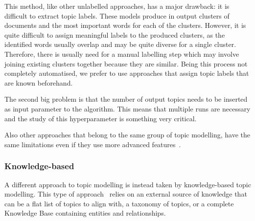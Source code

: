This method, like other unlabelled approaches, has a major drawback: it is difficult to extract topic labels.
These models produce in output clusters of documents and the most important words for each of the clusters.
However, it is quite difficult to assign meaningful labels to the produced clusters, as the identified words usually overlap and may be quite diverse for a single cluster.
Therefore, there is usually need for a manual labelling step which may involve joining existing clusters together because they are similar.
Being this process not completely automatised, we prefer to use approaches that assign topic labels that are known beforehand.


The second big problem is that the number of output topics needs to be inserted as input parameter to the algorithm. This means that multiple runs are necessary and the study of this hyperparameter is something very critical.

Also other approaches that belong to the same group of topic modelling, have the same limitations even if they use more advanced features~\citep{wang2012nonnegative,landauer1998introduction,grootendorst2022bertopic}.


\subsubsection{Knowledge-based}

A different approach to topic modelling is instead taken by knowledge-based topic modelling.
%
This type of approach~\citep{chen2013leveraging,allahyari2017knowledge,xu2018hierarchical,ali2019transportation} relies on an external source of knowledge that can be a flat list of topics to align with, a taxonomy of topics, or a complete Knowledge Base containing entities and relationships.

